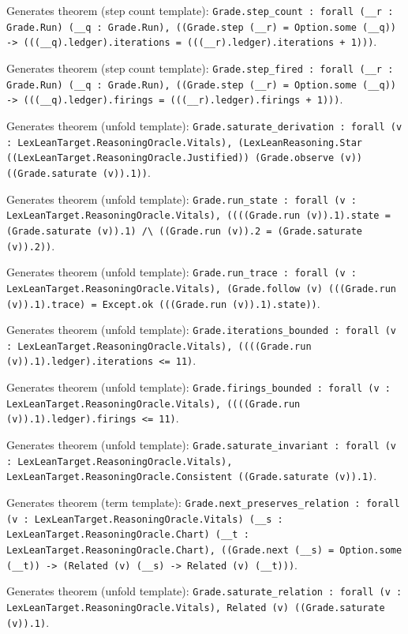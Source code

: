 \documentclass[11pt]{article}
\begin{document}
\noindent Generates theorem (step count template): \texttt{Grade.step\_count : forall (\_\_r : Grade.Run) (\_\_q : Grade.Run), ((Grade.step (\_\_r) = Option.some (\_\_q)) -> (((\_\_q).ledger).iterations = (((\_\_r).ledger).iterations + 1)))}.\par
\noindent Generates theorem (step count template): \texttt{Grade.step\_fired : forall (\_\_r : Grade.Run) (\_\_q : Grade.Run), ((Grade.step (\_\_r) = Option.some (\_\_q)) -> (((\_\_q).ledger).firings = (((\_\_r).ledger).firings + 1)))}.\par
\noindent Generates theorem (unfold template): \texttt{Grade.saturate\_derivation : forall (v : LexLeanTarget.ReasoningOracle.Vitals), (LexLeanReasoning.Star ((LexLeanTarget.ReasoningOracle.Justified)) (Grade.observe (v)) ((Grade.saturate (v)).1))}.\par
\noindent Generates theorem (unfold template): \texttt{Grade.run\_state : forall (v : LexLeanTarget.ReasoningOracle.Vitals), ((((Grade.run (v)).1).state = (Grade.saturate (v)).1) /\textbackslash{} ((Grade.run (v)).2 = (Grade.saturate (v)).2))}.\par
\noindent Generates theorem (unfold template): \texttt{Grade.run\_trace : forall (v : LexLeanTarget.ReasoningOracle.Vitals), (Grade.follow (v) (((Grade.run (v)).1).trace) = Except.ok (((Grade.run (v)).1).state))}.\par
\noindent Generates theorem (unfold template): \texttt{Grade.iterations\_bounded : forall (v : LexLeanTarget.ReasoningOracle.Vitals), ((((Grade.run (v)).1).ledger).iterations <= 11)}.\par
\noindent Generates theorem (unfold template): \texttt{Grade.firings\_bounded : forall (v : LexLeanTarget.ReasoningOracle.Vitals), ((((Grade.run (v)).1).ledger).firings <= 11)}.\par
\noindent Generates theorem (unfold template): \texttt{Grade.saturate\_invariant : forall (v : LexLeanTarget.ReasoningOracle.Vitals), LexLeanTarget.ReasoningOracle.Consistent ((Grade.saturate (v)).1)}.\par
\noindent Generates theorem (term template): \texttt{Grade.next\_preserves\_relation : forall (v : LexLeanTarget.ReasoningOracle.Vitals) (\_\_s : LexLeanTarget.ReasoningOracle.Chart) (\_\_t : LexLeanTarget.ReasoningOracle.Chart), ((Grade.next (\_\_s) = Option.some (\_\_t)) -> (Related (v) (\_\_s) -> Related (v) (\_\_t)))}.\par
\noindent Generates theorem (unfold template): \texttt{Grade.saturate\_relation : forall (v : LexLeanTarget.ReasoningOracle.Vitals), Related (v) ((Grade.saturate (v)).1)}.\par
\end{document}
